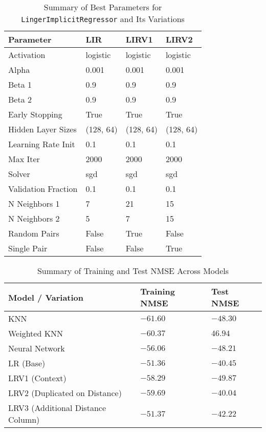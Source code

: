 \documentclass[a4paper, 12pt]{report}
\begin{document}
\begin{table}[H]
    \centering
    \caption{Summary of Best Parameters for \texttt{LingerImplicitRegressor} and Its Variations}
    \label{tab:best_parameters_LingerImageRegressor_variations_exp4}
    \begin{tabular}{|l|l|l|l|}
    \hline
    \textbf{Parameter} & \textbf{LIR} & \textbf{LIRV1} & \textbf{LIRV2} \\
    \hline
    Activation & logistic & logistic & logistic \\
    Alpha & 0.001 & 0.001 & 0.001 \\
    Beta 1 & 0.9 & 0.9 & 0.9 \\
    Beta 2 & 0.9 & 0.9 & 0.9 \\
    Early Stopping & True & True & True \\
    Hidden Layer Sizes & (128, 64) & (128, 64) & (128, 64) \\
    Learning Rate Init & 0.1 & 0.1 & 0.1 \\
    Max Iter & 2000 & 2000 & 2000 \\
    Solver & sgd & sgd & sgd \\
    Validation Fraction & 0.1 & 0.1 & 0.1 \\
    N Neighbors 1 & 7 & 21 & 15 \\
    N Neighbors 2 & 5 & 7 & 15 \\
    Random Pairs & False & True & False \\
    Single Pair & False & False & True \\
    \hline
    \end{tabular}
\end{table}

\begin{table}[H]
    \centering
    \caption{Summary of Training and Test NMSE Across Models}
    \label{tab:summary_nmse_all_models_MNSE_exp4}
    \small
    \begin{tabular}{|l|l|l|}
    \toprule
    \textbf{Model / Variation} & \textbf{Training NMSE} & \textbf{Test NMSE} \\
    \midrule
    KNN & $-61.60$ & $-48.30$ \\
    Weighted KNN & $-60.37$ & $46.94$ \\
    Neural Network & $-56.06$ & $-48.21$ \\
    LR (Base) & $-51.36$ & $-40.45$ \\
    LRV1 (Context) & $-58.29$ & $-49.87$ \\
    LRV2 (Duplicated on Distance) & $-59.69$ & $-40.04$ \\
    LRV3 (Additional Distance Column) & $-51.37$ & $-42.22$ \\
    \bottomrule
    \end{tabular}
\end{table}
\end{document}
